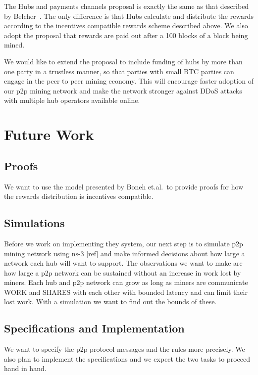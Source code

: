 \documentclass{article}
\begin{document}
The Hubs and payments channels proposal is exactly the same as that
described by Belcher~\cite{channels-for-rewards}. The only difference
is that Hubs calculate and distribute the rewards according to the
incentives compatible rewards scheme described above. We also adopt
the proposal that rewards are paid out after a 100 blocks of a block
being mined.

We would like to extend the proposal to include funding of hubs by
more than one party in a trustless manner, so that parties with small
BTC parties can engage in the peer to peer mining economy. This will
encourage faster adoption of our p2p mining network and make the
network stronger against DDoS attacks with multiple hub operators
available online.




   

\section{Future Work}

\subsection{Proofs}

We want to use the model presented by Boneh et.al.\ to provide proofs
for how the rewards distribution is incentives compatible.

\subsection{Simulations}
Before we work on implementing they system, our next step is to
simulate p2p mining network using ns-3 [ref] and make informed
decisions about how large a network each hub will want to support. The
observations we want to make are how large a p2p network can be
sustained without an increase in work lost by miners. Each hub and p2p
network can grow as long as miners are communicate WORK and SHARES
with each other with bounded latency and can limit their lost
work. With a simulation we want to find out the bounds of these.

\subsection{Specifications and Implementation}

We want to specify the p2p protocol messages and the rules more
precisely. We also plan to implement the specifications and we expect
the two tasks to proceed hand in hand.

 

\end{document}
